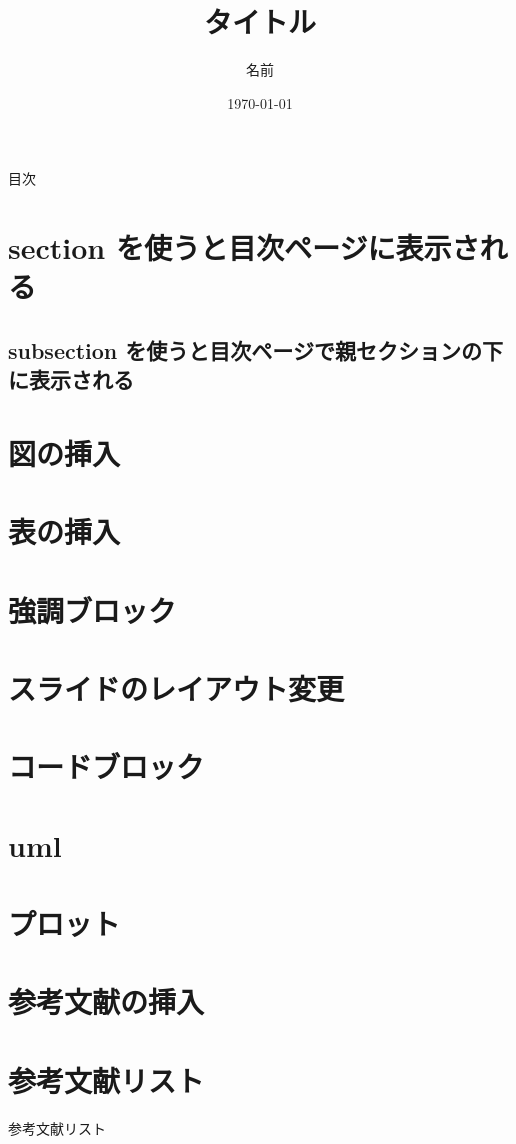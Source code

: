 \documentclass[aspectratio=169]{beamer}
\title{タイトル}
\author{名前}
\institute{所属}
\date{\today}   %
\begin{document}
\frame{\titlepage}

\begin{frame}{目次}
  \tableofcontents
\end{frame}

\section{section を使うと目次ページに表示される}
\subsection{subsection を使うと目次ページで親セクションの下に表示される}

\section{図の挿入}


\section{表の挿入}


\section{強調ブロック}


\section{スライドのレイアウト変更}


\section{コードブロック}


\section{uml}


\section{プロット}


\section{参考文献の挿入}


\section{参考文献リスト}
\begin{frame}{参考文献リスト}
  \printbibliography  
\end{frame}

\end{document}
